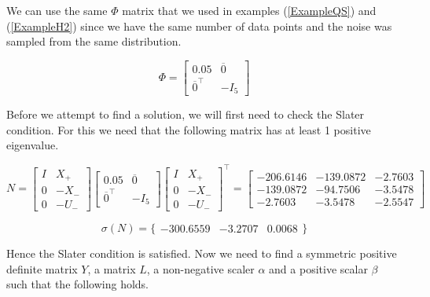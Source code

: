 We can use the same $\Phi$ matrix that we used in examples (\ref{ExampleQS}) and (\ref{ExampleH2}) since we have the same number of data points and the noise was sampled from the same distribution. 

\begin{equation*}
\Phi = \begin{bmatrix} 0.05 & \overline{0} \\ \overline{0}^\top & -I_5 \end{bmatrix}
\end{equation*}

Before we attempt to find a solution, we will first need to check the Slater condition. For this we need that the following matrix has at least 1 positive eigenvalue.

\begin{equation*}
N = 
\begin{bmatrix} I&X_+ \\ 0 & -X_- \\ 0&-U_- \end{bmatrix}
\begin{bmatrix} 0.05 & \overline{0} \\ \overline{0}^\top & -I_5 \end{bmatrix}
\begin{bmatrix} I&X_+ \\ 0 & -X_- \\ 0&-U_- \end{bmatrix}^\top 
=
\begin{bmatrix} 
 -206.6146 &-139.0872 &  -2.7603\\
 -139.0872 & -94.7506 &  -3.5478\\
   -2.7603 &  -3.5478 &  -2.5547
\end{bmatrix} 
\end{equation*}

\begin{equation*}
\sigma(N) = \{ \begin{array}{ccc}
	-300.6559 & -3.2707 & 0.0068
\end{array} \}
\end{equation*}

Hence the Slater condition is satisfied. Now we need to find a symmetric positive definite matrix $Y$, a matrix $L$, a non-negative scaler $\alpha$ and a positive scalar $\beta$ such that the following holds.

